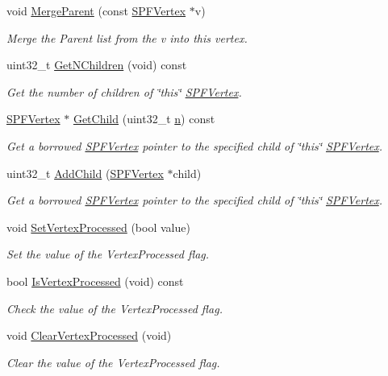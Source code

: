 \begin{DoxyCompactItemize}
void \hyperlink{classns3_1_1SPFVertex_a1f8549748a9888722110a947f5932981}{Merge\+Parent} (const \hyperlink{classns3_1_1SPFVertex}{S\+P\+F\+Vertex} $\ast$v)
\begin{DoxyCompactList}\small\item\em Merge the Parent list from the v into this vertex. \end{DoxyCompactList}\item 
uint32\+\_\+t \hyperlink{classns3_1_1SPFVertex_a7586cee5234643454032e36b3383fc59}{Get\+N\+Children} (void) const 
\begin{DoxyCompactList}\small\item\em Get the number of children of \char`\"{}this\char`\"{} \hyperlink{classns3_1_1SPFVertex}{S\+P\+F\+Vertex}. \end{DoxyCompactList}\item 
\hyperlink{classns3_1_1SPFVertex}{S\+P\+F\+Vertex} $\ast$ \hyperlink{classns3_1_1SPFVertex_ac7c82620504d000211066ce47da176f4}{Get\+Child} (uint32\+\_\+t \hyperlink{lte__link__budget__x2__handover__measures_8m_abdb05bc5a064cf642a06c83b3392f148}{n}) const 
\begin{DoxyCompactList}\small\item\em Get a borrowed \hyperlink{classns3_1_1SPFVertex}{S\+P\+F\+Vertex} pointer to the specified child of \char`\"{}this\char`\"{} \hyperlink{classns3_1_1SPFVertex}{S\+P\+F\+Vertex}. \end{DoxyCompactList}\item 
uint32\+\_\+t \hyperlink{classns3_1_1SPFVertex_ae15d2c3bc1fb5285f467b494d27869d9}{Add\+Child} (\hyperlink{classns3_1_1SPFVertex}{S\+P\+F\+Vertex} $\ast$child)
\begin{DoxyCompactList}\small\item\em Get a borrowed \hyperlink{classns3_1_1SPFVertex}{S\+P\+F\+Vertex} pointer to the specified child of \char`\"{}this\char`\"{} \hyperlink{classns3_1_1SPFVertex}{S\+P\+F\+Vertex}. \end{DoxyCompactList}\item 
void \hyperlink{classns3_1_1SPFVertex_a87162c9bbf4580752a5b6a1b284c1c3d}{Set\+Vertex\+Processed} (bool value)
\begin{DoxyCompactList}\small\item\em Set the value of the Vertex\+Processed flag. \end{DoxyCompactList}\item 
bool \hyperlink{classns3_1_1SPFVertex_a6f6493e872136c93b52d83d5eb3b3560}{Is\+Vertex\+Processed} (void) const 
\begin{DoxyCompactList}\small\item\em Check the value of the Vertex\+Processed flag. \end{DoxyCompactList}\item 
void \hyperlink{classns3_1_1SPFVertex_add13fdc23d9df184271153f8efdca0b2}{Clear\+Vertex\+Processed} (void)
\begin{DoxyCompactList}\small\item\em Clear the value of the Vertex\+Processed flag. \end{DoxyCompactList}\end{DoxyCompactItemize}

